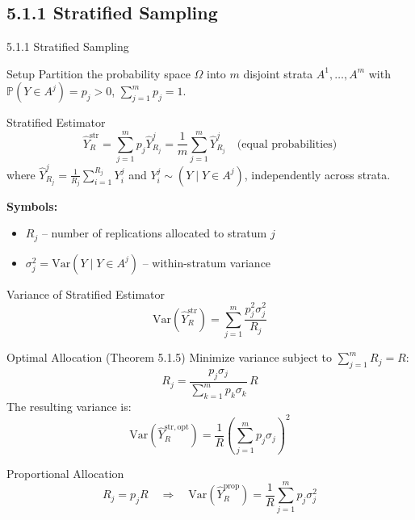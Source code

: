 \documentclass[aspectratio=169,10pt]{beamer}
\begin{document}
\subsection{5.1.1 Stratified Sampling}

\begin{frame}[allowframebreaks]{5.1.1 Stratified Sampling}

  \begin{block}{Setup}
    Partition the probability space $\Omega$ into $m$ disjoint strata
    $A^1, \ldots, A^m$ with $\mathbb{P}(Y \in A^j) = p_j > 0$,
    $\sum_{j=1}^m p_j = 1$.
  \end{block}

  \begin{block}{Stratified Estimator}
    \[
      \hat{Y}_R^{\mathrm{str}} = \sum_{j=1}^m p_j \hat{Y}_{R_j}^j
      = \frac{1}{m}\sum_{j=1}^m \hat{Y}_{R_j}^j
      \quad\text{(equal probabilities)}
    \]
    where $\hat{Y}_{R_j}^j = \frac{1}{R_j}\sum_{i=1}^{R_j} Y_i^j$ and
    $Y_i^j \sim (Y \mid Y \in A^j)$, independently across strata.
  \end{block}

  \textbf{Symbols:}
  \begin{itemize}
    \item $R_j$ -- number of replications allocated to stratum $j$
    \item $\sigma_j^2 = \mathrm{Var}(Y \mid Y \in A^j)$ -- within-stratum variance
  \end{itemize}

  \framebreak

  \begin{block}{Variance of Stratified Estimator}
    \[
      \mathrm{Var}(\hat{Y}_R^{\mathrm{str}}) = \sum_{j=1}^m \frac{p_j^2 \sigma_j^2}{R_j}
    \]
  \end{block}

  \begin{block}{Optimal Allocation (Theorem 5.1.5)}
    Minimize variance subject to $\sum_{j=1}^m R_j = R$:
    \[
      R_j = \frac{p_j \sigma_j}{\sum_{k=1}^m p_k \sigma_k}\, R
    \]
    The resulting variance is:
    \[
      \mathrm{Var}(\hat{Y}_R^{\mathrm{str, opt}}) = \frac{1}{R}
      \left(\sum_{j=1}^m p_j \sigma_j\right)^2
    \]
  \end{block}

  \begin{block}{Proportional Allocation}
    \[
      R_j = p_j R \quad \Rightarrow \quad
      \mathrm{Var}(\hat{Y}_R^{\mathrm{prop}}) = \frac{1}{R}\sum_{j=1}^m p_j \sigma_j^2
    \]
  \end{block}


\end{frame}
\end{document}
